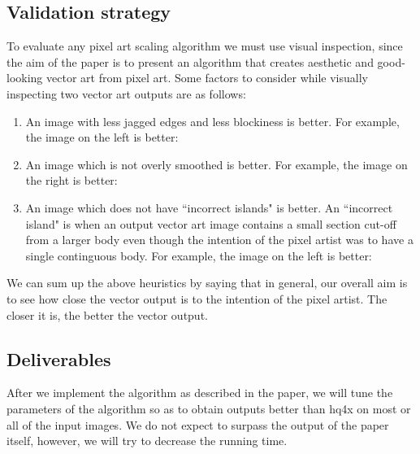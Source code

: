 \documentclass[a4paper,9pt]{article}
\begin{document}
\textcolor{myrust}{\section{Validation strategy}}

To evaluate any pixel art scaling algorithm we must use visual inspection, since the aim of the paper is to present an algorithm that creates aesthetic and good-looking vector art from pixel art. Some factors to consider while visually inspecting two vector art outputs are as follows:\\

\begin{enumerate}
  \itemsep-0.25em
  \item An image with less jagged edges and less blockiness is better. For example, the image on the left is better:\\
  \item An image which is not overly smoothed is better. For example, the image on the right is better:\\
  \item An image which does not have ``incorrect islands" is better. An ``incorrect island" is when an output vector art image contains a small section cut-off from a larger body even though the intention of the pixel artist was to have a single continguous body. For example, the image on the left is better:\\
\end{enumerate}

We can sum up the above heuristics by saying that in general, our overall aim is to see how close the vector output is to the intention of the pixel artist. The closer it is, the better the vector output.

\textcolor{myrust}{\section{Deliverables}}

After we implement the algorithm as described in the paper, we will tune the parameters of the algorithm so as to obtain outputs better than hq4x on most or all of the input images. We do not expect to surpass the output of the paper itself, however, we will try to decrease the running time.
\end{document}
